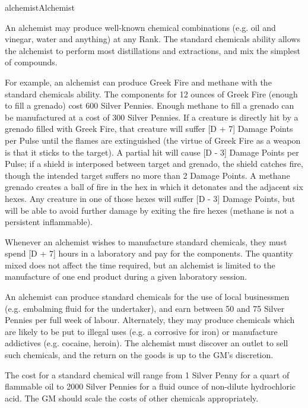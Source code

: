 \begin{Skill}[1.1]{alchemist}{Alchemist}

An alchemist may produce well-known chemical combinations (e.g. oil
and vinegar, water and anything) at any Rank. The standard chemicals
ability allows the alchemist to perform most distillations and
extractions, and mix the simplest of compounds.

For example, an alchemist can produce Greek Fire and methane with the
standard chemicals ability.  The components for 12 ounces of Greek
Fire (enough to fill a grenado) cost 600 Silver Pennies.  Enough
methane to fill a grenado can be manufactured at a cost of 300 Silver
Pennies. If a creature is directly hit by a grenado filled with Greek
Fire, that creature will suffer [D + 7] Damage Points per Pulse until
the flames are extinguished (the virtue of Greek Fire as a weapon is
that it sticks to the target).  A partial hit will cause [D - 3]
Damage Points per Pulse; if a shield is interposed between target and
grenado, the shield catches fire, though the intended target suffers
no more than 2 Damage Points. A methane grenado creates a ball of fire
in the hex in which it detonates and the adjacent six hexes.  Any
creature in one of those hexes will suffer [D - 3] Damage Points, but
will be able to avoid further damage by exiting the fire hexes
(methane is not a persistent inflammable).

Whenever an alchemist wishes to manufacture standard chemicals, they
must spend [D + 7] hours in a laboratory and pay for the components.
The quantity mixed does not affect the time required, but an alchemist
is limited to the manufacture of one end product during a given
laboratory session.

An alchemist can produce standard chemicals for the use of local
businessmen (e.g. embalming fluid for the undertaker), and earn
between 50 and 75 Silver Pennies per full week of labour. Alternately,
they may produce chemicals which are likely to be put to illegal uses
(e.g.  a corrosive for iron) or manufacture addictives (e.g.  cocaine,
heroin).  The alchemist must discover an outlet to sell such
chemicals, and the return on the goods is up to the GM’s discretion.

The cost for a standard chemical will range from 1 Silver Penny for a
quart of flammable oil to 2000 Silver Pennies for a fluid ounce of
non-dilute hydrochloric acid.  The GM should scale the costs of other
chemicals appropriately.


\end{Skill}
